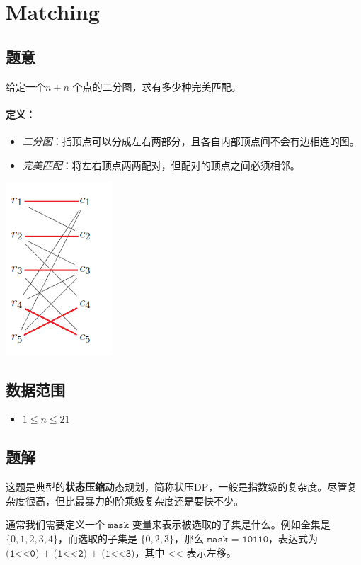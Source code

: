 \section{Matching}
\subsection*{题意}
给定一个$ n+n$ 个点的二分图，求有多少种完美匹配。

\paragraph{定义：}
\begin{itemize}
\item \textit{二分图}：指顶点可以分成左右两部分，且各自内部顶点间不会有边相连的图。
\item \textit{完美匹配}：将左右顶点两两配对，但配对的顶点之间必须相邻。
\end{itemize}
\begin{center}
\includegraphics[width=4cm]{Pics/Perfect Matching.png}
\end{center}
\subsection*{数据范围}
\begin{itemize}
\item $1 \leq n \leq 21$
\end{itemize}

\subsection*{题解}
这题是典型的\textbf{状态压缩}动态规划，简称状压DP，一般是指数级的复杂度。尽管复杂度很高，但比最暴力的阶乘级复杂度还是要快不少。

通常我们需要定义一个 $\texttt{mask}$ 变量来表示被选取的子集是什么。例如全集是 $\{0,1,2,3,4\}$，而选取的子集是 $\{0,2,3\}$，那么 $\texttt{mask = 10110}$，表达式为 $\texttt{(1<<0) + (1<<2) + (1<<3)}$，其中 $\texttt{<<}$ 表示左移。

